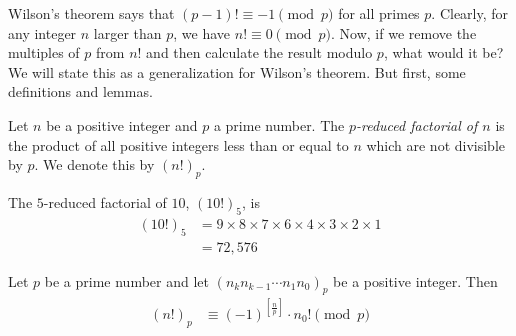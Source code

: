 \documentclass{subfile}
\begin{document}
Wilson's theorem says that $(p-1)! \equiv -1 \pmod p$ for all primes $p$. Clearly, for any integer $n$ larger than $p$, we have $n! \equiv 0 \pmod p$. Now, if we remove the multiples of $p$ from $n!$ and then calculate the result modulo $p$, what would it be? We will state this as a generalization for Wilson's theorem. But first, some definitions and lemmas.

	\begin{definition}
		Let $n$ be a positive integer and $p$ a prime number. The \textit{$p$-reduced factorial of $n$} is the product of all positive integers less than or equal to $n$ which are not divisible by $p$. We denote this by $(n!)_p$.
	\end{definition}

	\begin{example}
		The $5$-reduced factorial of $10$, $(10!)_5$, is
			\begin{align*}
				(10!)_5
					& = 9 \times 8 \times 7 \times 6 \times 4 \times 3 \times 2 \times 1\\
					& = 72,576
			\end{align*}
	\end{example}


	\begin{theorem}\label{thm:reducedfactorialmodp}
		Let $p$ be a prime number and let $(n_k n_{k-1}\cdots n_1 n_0)_p$ be a positive integer. Then
			\begin{align*}
				(n!)_p
					& \equiv (-1)^{\left[\frac{n}{p}\right]} \cdot n_0!\pmod p
			\end{align*}
	\end{theorem}
\end{document}
